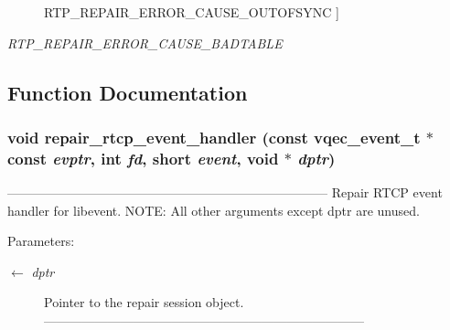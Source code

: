 \begin{Desc}
\begin{description}
{RTP\_\-REPAIR\_\-ERROR\_\-CAUSE\_\-OUTOFSYNC\label{rtp__repair__recv_8c_a477403dfea5e50d9f78e9e8e45c2963474732856aa020a9efb7519fd06dd538}
}]\item[{\em 
RTP\_\-REPAIR\_\-ERROR\_\-CAUSE\_\-BADTABLE\label{rtp__repair__recv_8c_a477403dfea5e50d9f78e9e8e45c296330068ed3513a93380580d995fb9b6262}
}]\end{description}
\end{Desc}



\subsection{Function Documentation}
\subsubsection{\setlength{\rightskip}{0pt plus 5cm}void repair\_\-rtcp\_\-event\_\-handler (const vqec\_\-event\_\-t $\ast$const  {\em evptr}, int {\em fd}, short {\em event}, void $\ast$ {\em dptr})}\label{rtp__repair__recv_8c_64a8164900cfb8a5d349feac015ac3b7}


--------------------------------------------------------------------------- Repair RTCP event handler for libevent. NOTE: All other arguments except dptr are unused.

\begin{Desc}
\item[Parameters:]
\begin{description}
\item[\mbox{$\leftarrow$} {\em dptr}]Pointer to the repair session object. --------------------------------------------------------------------------- \end{description}
\end{Desc}
